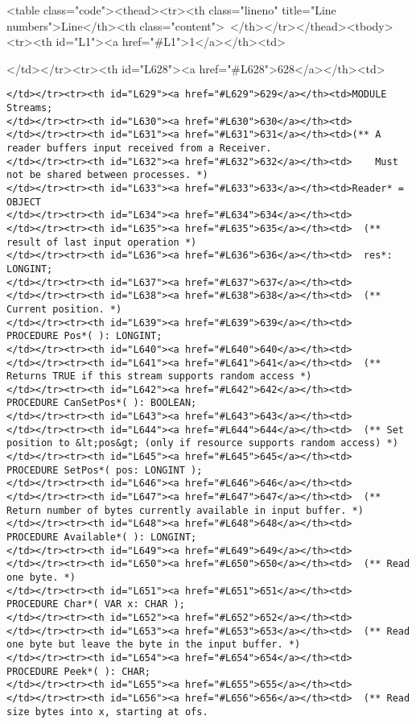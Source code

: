<table class="code"><thead><tr><th class="lineno" title="Line numbers">Line</th><th class="content"> </th></tr></thead><tbody><tr><th id="L1"><a href="#L1">1</a></th><td>\documentclass[a4paper,11pt]{article}
\begin{document}
</td></tr><tr><th id="L628"><a href="#L628">628</a></th><td>\begin{lstlisting}[language=Oberon,frame=none,caption={Simplified Reader and Writer Interface}]
</td></tr><tr><th id="L629"><a href="#L629">629</a></th><td>MODULE Streams;
</td></tr><tr><th id="L630"><a href="#L630">630</a></th><td>
</td></tr><tr><th id="L631"><a href="#L631">631</a></th><td>(** A reader buffers input received from a Receiver.
</td></tr><tr><th id="L632"><a href="#L632">632</a></th><td>    Must not be shared between processes. *)
</td></tr><tr><th id="L633"><a href="#L633">633</a></th><td>Reader* = OBJECT
</td></tr><tr><th id="L634"><a href="#L634">634</a></th><td>
</td></tr><tr><th id="L635"><a href="#L635">635</a></th><td>  (** result of last input operation *)
</td></tr><tr><th id="L636"><a href="#L636">636</a></th><td>  res*: LONGINT;
</td></tr><tr><th id="L637"><a href="#L637">637</a></th><td>
</td></tr><tr><th id="L638"><a href="#L638">638</a></th><td>  (** Current position. *)
</td></tr><tr><th id="L639"><a href="#L639">639</a></th><td>  PROCEDURE Pos*( ): LONGINT;
</td></tr><tr><th id="L640"><a href="#L640">640</a></th><td>
</td></tr><tr><th id="L641"><a href="#L641">641</a></th><td>  (** Returns TRUE if this stream supports random access *)
</td></tr><tr><th id="L642"><a href="#L642">642</a></th><td>  PROCEDURE CanSetPos*( ): BOOLEAN;
</td></tr><tr><th id="L643"><a href="#L643">643</a></th><td>
</td></tr><tr><th id="L644"><a href="#L644">644</a></th><td>  (** Set position to &lt;pos&gt; (only if resource supports random access) *)
</td></tr><tr><th id="L645"><a href="#L645">645</a></th><td>  PROCEDURE SetPos*( pos: LONGINT );
</td></tr><tr><th id="L646"><a href="#L646">646</a></th><td>
</td></tr><tr><th id="L647"><a href="#L647">647</a></th><td>  (** Return number of bytes currently available in input buffer. *)
</td></tr><tr><th id="L648"><a href="#L648">648</a></th><td>  PROCEDURE Available*( ): LONGINT;
</td></tr><tr><th id="L649"><a href="#L649">649</a></th><td>
</td></tr><tr><th id="L650"><a href="#L650">650</a></th><td>  (** Read one byte. *)
</td></tr><tr><th id="L651"><a href="#L651">651</a></th><td>  PROCEDURE Char*( VAR x: CHAR );
</td></tr><tr><th id="L652"><a href="#L652">652</a></th><td>
</td></tr><tr><th id="L653"><a href="#L653">653</a></th><td>  (** Read one byte but leave the byte in the input buffer. *)
</td></tr><tr><th id="L654"><a href="#L654">654</a></th><td>  PROCEDURE Peek*( ): CHAR;
</td></tr><tr><th id="L655"><a href="#L655">655</a></th><td>
</td></tr><tr><th id="L656"><a href="#L656">656</a></th><td>  (** Read size bytes into x, starting at ofs.

\end{lstlisting}
\end{document}
